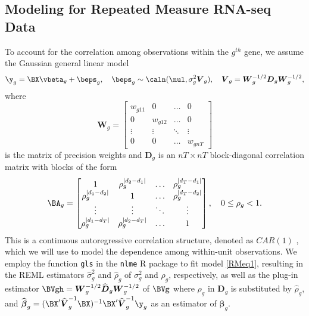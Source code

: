 \subsection{Modeling for Repeated Measure RNA-seq Data}\label{RMvoomSec}
To account for the correlation among observations within  the $g^{th}$ gene, we assume the Gaussian general linear model
\begin{equation}\label{RMeq1}
 \y_g = \BX\vbeta_g +\beps_g, \quad  \beps_g \sim \caln(\nul, \sigma^2_g\boldsymbol{V}_g), \quad \boldsymbol{V}_g =    \boldsymbol{W}_g^{-1/2} \boldsymbol{D}_g \boldsymbol{W}_g^{-1/2} ,
\end{equation}
where
\[
\boldsymbol{W}_g =
\begin{bmatrix}
w_{g11} &  0  & \ldots & 0\\
0  &  w_{g12} & \ldots & 0\\
\vdots & \vdots & \ddots & \vdots\\
0  &   0       &\ldots & w_{gnT}
\end{bmatrix}
\]
is the matrix of precision weights
and
$\boldsymbol{D}_g$ is an $nT\times nT$  block-diagonal correlation matrix with blocks of the form
\[
\BA_g =
\begin{bmatrix}
1 &  \rho_g^{|d_2 -d_1|}  & \ldots & \rho_g^{|d_T -d_1|}\\
 \rho_g^{|d_1 -d_2|}   &  1 & \ldots & \rho_g^{|d_T -d_2|}\\
\vdots & \vdots & \ddots & \vdots\\
\rho_g^{|d_1 -d_T|}  &   \rho_g^{|d_2 -d_T|}       &\ldots & 1
\end{bmatrix},
\quad 0 \leq \rho_g < 1.
\]
This is a continuous autoregressive correlation structure, denoted as $CAR(1)$ \citep{pinheiro2000}, which we will use to model the dependence among within-unit observations. We employ the function \texttt{gls} in the \texttt{nlme} R package \citep{Pinheiro2017R} to fit model \eqref{RMeq1},  resulting in the REML estimators $\widehat{\sigma}^2_g$ and $\widehat{\rho}_g$ of $\sigma_g^2$ and $ \rho_g$, respectively, as well as  the plug-in estimator $\BVgh = \boldsymbol{W}_g^{-1/2} \widehat{\boldsymbol{D}}_g\boldsymbol{W}_g^{-1/2}$ of  $\BVg$ where $\rho_g$  in $\boldsymbol{D}_g$ is substituted by $\widehat{\rho}_g$, and
$\widehat{\boldsymbol{\beta}}_g = (\BX'\widehat{\boldsymbol{V}}_g^{-1}\BX)^{-1} \BX'\widehat{\boldsymbol{V}}_g^{-1}\y_g$ as an estimator of $\boldsymbol{\beta}_g$.
